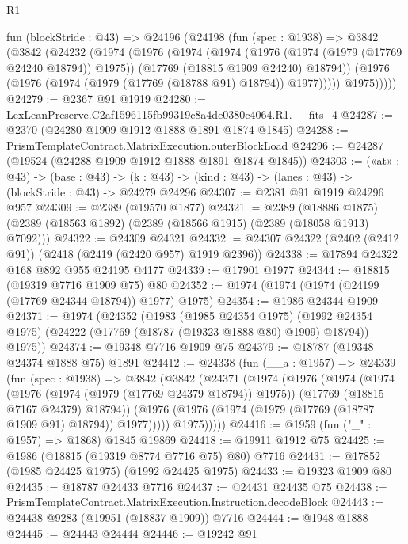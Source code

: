 \begin{lexlean}{R1}
\begin{coremodule}
  fun (blockStride : @43) =>
  @24196
    (@24198
      (fun (spec : @1938) =>
      @3842
        (@3842
          (@24232
            (@1974
              (@1976
                (@1974
                  (@1974
                    (@1976 (@1974 (@1979 (@17769 @24240 @18794)) @1975))
                    (@17769 (@18815 @1909 @24240) @18794))
                  (@1976 (@1976 (@1974 (@1979 (@17769 (@18788 @91) @18794)) @1977)))))
              @1975)))))
@24279 := @2367 @91 @1919
@24280 := LexLeanPreserve.C2af1596115fb99319c8a4de0380c4064.R1.__fits_4
@24287 := @2370 (@24280 @1909 @1912 @1888 @1891 @1874 @1845)
@24288 := PrismTemplateContract.MatrixExecution.outerBlockLoad
@24296 := @24287 (@19524 (@24288 @1909 @1912 @1888 @1891 @1874 @1845))
@24303 := («at» : @43) ->
  (base : @43) -> (k : @43) -> (kind : @43) -> (lanes : @43) -> (blockStride : @43) -> @24279 @24296
@24307 := @2381 @91 @1919 @24296 @957
@24309 := @2389 (@19570 @1877)
@24321 := @2389
    (@18886 @1875)
    (@2389 (@18563 @1892) (@2389 (@18566 @1915) (@2389 (@18058 @1913) @7092)))
@24322 := @24309 @24321
@24332 := @24307 @24322 (@2402 (@2412 @91)) (@2418 (@2419 (@2420 @957) @1919 @2396))
@24338 := @17894 @24322 @168 @892 @955 @24195 @4177
@24339 := @17901 @1977
@24344 := @18815 (@19319 @7716 @1909 @75) @80
@24352 := @1974 (@1974 (@1974 (@24199 (@17769 @24344 @18794)) @1977) @1975)
@24354 := @1986 @24344 @1909
@24371 := @1974
    (@24352
      (@1983
        (@1985 @24354 @1975)
        (@1992 @24354 @1975)
        (@24222 (@17769 (@18787 (@19323 @1888 @80) @1909) @18794))
        @1975))
@24374 := @19348 @7716 @1909 @75
@24379 := @18787 (@19348 @24374 @1888 @75) @1891
@24412 := @24338
    (fun (__a : @1957) =>
    @24339
      (fun (spec : @1938) =>
      @3842
        (@3842
          (@24371
            (@1974
              (@1976
                (@1974
                  (@1974
                    (@1976 (@1974 (@1979 (@17769 @24379 @18794)) @1975))
                    (@17769 (@18815 @7167 @24379) @18794))
                  (@1976 (@1976 (@1974 (@1979 (@17769 (@18787 @1909 @91) @18794)) @1977)))))
              @1975)))))
@24416 := @1959 (fun ("_" : @1957) => @1868) @1845 @19869
@24418 := @19911 @1912 @75
@24425 := @1986 (@18815 (@19319 @8774 @7716 @75) @80) @7716
@24431 := @17852 (@1985 @24425 @1975) (@1992 @24425 @1975)
@24433 := @19323 @1909 @80
@24435 := @18787 @24433 @7716
@24437 := @24431 @24435 @75
@24438 := PrismTemplateContract.MatrixExecution.Instruction.decodeBlock
@24443 := @24438 @9283 (@19951 (@18837 @1909)) @7716
@24444 := @1948 @1888
@24445 := @24443 @24444
@24446 := @19242 @91

\end{coremodule}
\end{lexlean}
